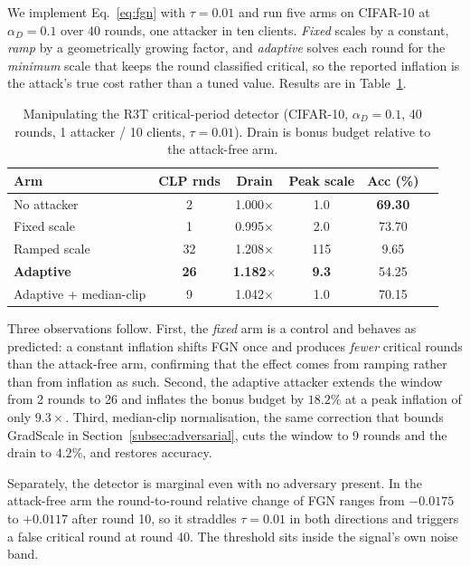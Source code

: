 \documentclass[conference]{IEEEtran}
\theoremstyle{remark}
\begin{document}
We implement Eq.~\ref{eq:fgn} with $\tau = 0.01$ and run five arms on
CIFAR-10 at $\alpha_D = 0.1$ over 40 rounds, one attacker in ten clients.
\emph{Fixed} scales by a constant, \emph{ramp} by a geometrically growing
factor, and \emph{adaptive} solves each round for the \emph{minimum} scale
that keeps the round classified critical, so the reported inflation is the
attack's true cost rather than a tuned value. Results are in
Table~\ref{tab:clp}.

\begin{table}[t]
\caption{Manipulating the R3T critical-period detector (CIFAR-10,
$\alpha_D{=}0.1$, 40 rounds, 1 attacker / 10 clients, $\tau{=}0.01$).
Drain is bonus budget relative to the attack-free arm.}
\label{tab:clp}
\centering
\renewcommand{\arraystretch}{1.1}
\setlength{\tabcolsep}{4pt}
\footnotesize
\begin{tabular}{lccccc}
\toprule
\textbf{Arm} & \textbf{CLP rnds} & \textbf{Drain} & \textbf{Peak scale}
& \textbf{Acc (\%)} \\
\midrule
No attacker            & 2  & 1.000$\times$ & 1.0  & \textbf{69.30} \\
Fixed scale            & 1  & 0.995$\times$ & 2.0  & 73.70 \\
Ramped scale           & 32 & 1.208$\times$ & 115  & 9.65  \\
\textbf{Adaptive}      & \textbf{26} & \textbf{1.182}$\times$
                       & \textbf{9.3} & 54.25 \\
Adaptive + median-clip & 9  & 1.042$\times$ & 1.0  & 70.15 \\
\bottomrule
\end{tabular}
\end{table}

Three observations follow. First, the \emph{fixed} arm is a control and
behaves as predicted: a constant inflation shifts FGN once and produces
\emph{fewer} critical rounds than the attack-free arm, confirming that the
effect comes from ramping rather than from inflation as such. Second, the
adaptive attacker extends the window from 2 rounds to 26 and inflates the
bonus budget by $18.2\%$ at a peak inflation of only $9.3\times$. Third,
median-clip normalisation, the same correction that bounds GradScale in
Section~\ref{subsec:adversarial}, cuts the window to 9 rounds and the
drain to $4.2\%$, and restores accuracy.

Separately, the detector is marginal even with no adversary present. In
the attack-free arm the round-to-round relative change of FGN ranges from
$-0.0175$ to $+0.0117$ after round 10, so it straddles $\tau = 0.01$ in
both directions and triggers a false critical round at round 40. The
threshold sits inside the signal's own noise band.
\end{document}
